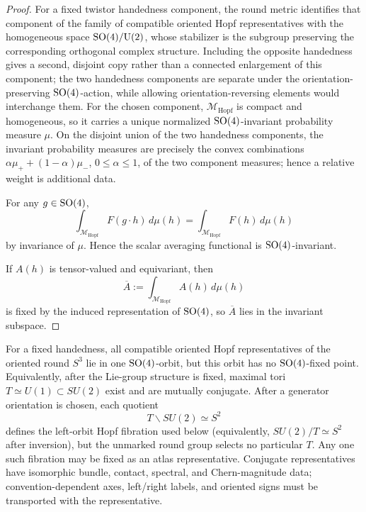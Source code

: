 \documentclass[11pt]{article}
\begin{document}
\begin{proof}
For a fixed twistor handedness component, the round metric identifies that
component of the family of compatible oriented Hopf representatives with the
homogeneous space $\mathrm{SO}(4)/\mathrm U(2)$, whose stabilizer is the subgroup
preserving the corresponding orthogonal complex structure.  Including the opposite handedness gives a second, disjoint copy rather than a connected enlargement of this component; the two handedness components are separate under the orientation-preserving \(\mathrm{SO}(4)\)-action, while allowing orientation-reversing elements would interchange them. For the chosen component,
$\mathcal M_{\mathrm{Hopf}}$ is compact and homogeneous, so it carries a unique
normalized $\mathrm{SO}(4)$-invariant probability measure $\mu$. On the disjoint union of the two handedness components, the invariant probability measures are precisely the convex combinations \(\alpha\mu_+ +(1-\alpha)\mu_-\), \(0\leq\alpha\leq1\), of the two component measures; hence a relative weight is additional data.

For any \(g\in\mathrm{SO}(4)\),
\[
\int_{\mathcal M_{\mathrm{Hopf}}}F(g\cdot h)\,d\mu(h)
=
\int_{\mathcal M_{\mathrm{Hopf}}}F(h)\,d\mu(h)
\]
by invariance of \(\mu\). Hence the scalar averaging functional is
\(\mathrm{SO}(4)\)-invariant.

If $A(h)$ is tensor-valued and equivariant, then
\[
\overline{A}:=\int_{\mathcal M_{\mathrm{Hopf}}}A(h)\,d\mu(h)
\]
is fixed by the induced representation of $\mathrm{SO}(4)$, so
$\overline{A}$ lies in the invariant subspace.
\end{proof}

\begin{corollary}
\label{p1:cor:hopf-class-no-axis}
For a fixed handedness, all compatible oriented Hopf representatives of the
oriented round \(S^3\) lie in one \(\mathrm{SO}(4)\)-orbit, but this orbit has no
\(\mathrm{SO}(4)\)-fixed point.  Equivalently, after the Lie-group structure is fixed,
maximal tori \(T\simeq U(1)\subset SU(2)\) exist and are mutually conjugate.
After a generator orientation is chosen, each quotient
\[
        T\backslash SU(2)\simeq S^2
\]
defines the left-orbit Hopf fibration used below (equivalently,
\(SU(2)/T\simeq S^2\) after inversion), but the unmarked round group selects no particular
\(T\).  Any one such fibration may be fixed as an atlas representative.
Conjugate representatives have isomorphic bundle, contact, spectral, and
Chern-magnitude data; convention-dependent axes, left/right labels, and
oriented signs must be transported with the representative.
\end{corollary}
\end{document}
